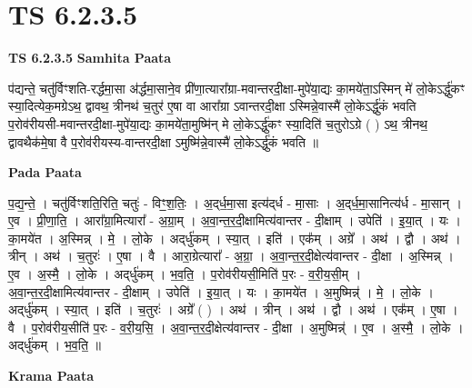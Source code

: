 \documentclass[17pt]{extarticle}
\begin{document}
\section{ TS 6.2.3.5 }

\textbf{TS 6.2.3.5 } \newline
\textbf{Samhita Paata} \newline

प॑द्यन्ते॒ चतु॑र्विꣳशति-रर्द्धमा॒सा अ॑र्द्धमा॒साने॒व प्री॑णा॒त्यारा᳚ग्रा-मवान्तरदी॒क्षा-मुपे॑या॒द्यः का॒मये॑ता॒ऽस्मिन् मे॑ लो॒केऽर्द्धु॑कꣳ स्या॒दित्येक॒मग्रेऽथ॒ द्वावथ॒ त्रीनथ॑ च॒तुर॑ ए॒षा वा आरा᳚ग्रा ऽवान्तरदी॒क्षा ऽस्मिन्ने॒वास्मै॑ लो॒केऽर्द्धु॑कं भवति प॒रोव॑रीयसी-मवान्तरदी॒क्षा-मुपे॑या॒द्यः का॒मये॑ता॒मुष्मि॑न् मे लो॒केऽर्द्धु॑कꣳ स्या॒दिति॑ च॒तुरोऽग्रे ( ) ऽथ॒ त्रीनथ॒ द्वावथैक॑मे॒षा वै प॒रोव॑रीयस्य-वान्तरदी॒क्षा ऽमुष्मि॑न्ने॒वास्मै॑ लो॒केऽर्द्धु॑कं भवति ॥ \newline

\textbf{Pada Paata} \newline

प॒द्य॒न्ते॒ । चतु॑र्विꣳशति॒रिति॒ चतुः॑ - विꣳ॒॒श॒तिः॒ । अ॒द्‌र्ध॒मा॒सा इत्य॑द्‌र्ध - मा॒साः । अ॒द्‌र्ध॒मा॒सानित्य॑र्ध - मा॒सान् । ए॒व । प्री॒णा॒ति॒ । आरा᳚ग्रा॒मित्यारा᳚ - अ॒ग्रा॒म् । अ॒वा॒न्त॒र॒दी॒क्षामित्य॑वान्तर - दी॒क्षाम् । उपेति॑ । इ॒या॒त् । यः । का॒मये॑त । अ॒स्मिन्न् । मे॒ । लो॒के । अद्‌र्धु॑कम् । स्या॒त् । इति॑ । एक᳚म् । अग्रे᳚ । अथ॑ । द्वौ । अथ॑ । त्रीन् । अथ॑ । च॒तुरः॑ । ए॒षा । वै । आरा॒ग्रेत्यारा᳚ - अ॒ग्रा॒ । अ॒वा॒न्त॒र॒दी॒क्षेत्य॑वान्तर - दी॒क्षा । अ॒स्मिन्न् । ए॒व । अ॒स्मै॒ । लो॒के । अद्‌र्धु॑कम् । भ॒व॒ति॒ । प॒रोव॑रीयसी॒मिति॑ प॒रः - व॒री॒य॒सी॒म् । अ॒वा॒न्त॒र॒दी॒क्षामित्य॑वान्तर - दी॒क्षाम् । उपेति॑ । इ॒या॒त् । यः । का॒मये॑त । अ॒मुष्मिन्न्॑ । मे॒ । लो॒के । अद्‌र्धु॑कम् । स्या॒त् । इति॑ । च॒तुरः॑ । अग्रे᳚ ( ) । अथ॑ । त्रीन् । अथ॑ । द्वौ । अथ॑ । एक᳚म् । ए॒षा । वै । प॒रोव॑रीय॒सीति॑ प॒रः - व॒री॒य॒सि॒ । अ॒वा॒न्त॒र॒दी॒क्षेत्य॑वान्तर - दी॒क्षा । अ॒मुष्मिन्न्॑ । ए॒व । अ॒स्मै॒ । लो॒के । अद्‌र्धु॑कम् । भ॒व॒ति॒ ॥  \newline


\textbf{Krama Paata} \newline
\end{document}
